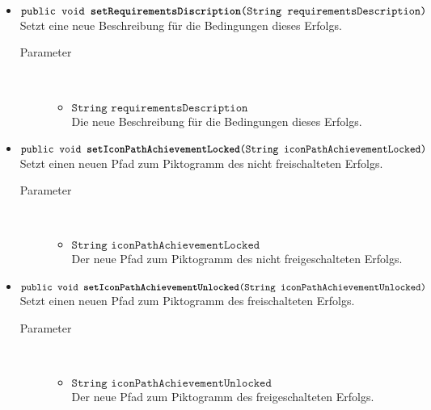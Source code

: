 \begin{description}
\begin{itemize}
		\item $\texttt{public void \textbf{setRequirementsDiscription}(String requirementsDescription)}$ \\ Setzt eine neue Beschreibung für die Bedingungen dieses Erfolgs.
		\begin{description}
			\item[Parameter] \hfill \\
			\vspace{-.8cm}
			\begin{itemize}
				\item $\texttt{String requirementsDescription}$ \\ Die neue Beschreibung für die Bedingungen dieses Erfolgs.
			\end{itemize}
		\end{description}

	\item $\texttt{public void \textbf{setIconPathAchievementLocked}(String iconPathAchievementLocked)}$ \\ Setzt einen neuen Pfad zum Piktogramm des nicht freischalteten Erfolgs.
		\begin{description}
			\item[Parameter] \hfill \\
			\vspace{-.8cm}
			\begin{itemize}
				\item $\texttt{String iconPathAchievementLocked}$ \\ Der neue Pfad zum Piktogramm des nicht freigeschalteten Erfolgs.
			\end{itemize}
		\end{description}
	
	\item $\texttt{public void \textbf{setIconPathAchievementUnlocked}(String iconPathAchievementUnlocked)}$ \\ Setzt einen neuen Pfad zum Piktogramm des freischalteten Erfolgs.
		\begin{description}
			\item[Parameter] \hfill \\
			\vspace{-.8cm}
			\begin{itemize}
				\item $\texttt{String iconPathAchievementUnlocked}$ \\ Der neue Pfad zum Piktogramm des freigeschalteten Erfolgs.
			\end{itemize}
		\end{description}
		

\end{itemize}
\end{description}

